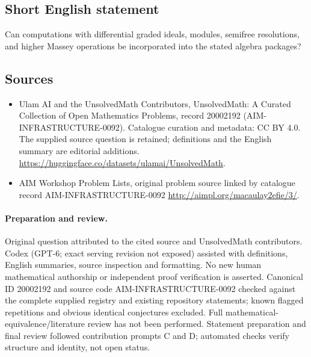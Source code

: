 \documentclass[11pt]{article}
\begin{document}
\subsection{Short English statement}
Can computations with differential graded ideals, modules, semifree resolutions, and higher Massey operations be incorporated into the stated algebra packages?
\subsection{Sources}
\begin{itemize}
\item[\hypertarget{source:20002192:1}{S1}] Ulam AI and the UnsolvedMath Contributors, UnsolvedMath: A Curated Collection of Open Mathematics Problems, record 20002192 (AIM-INFRASTRUCTURE-0092). Catalogue curation and metadata: CC BY 4.0. The supplied source question is retained; definitions and the English summary are editorial additions.
\url{https://huggingface.co/datasets/ulamai/UnsolvedMath}.
\item[\hypertarget{source:20002192:2}{S2}] AIM Workshop Problem Lists, original problem source linked by catalogue record AIM-INFRASTRUCTURE-0092
\url{http://aimpl.org/macaulay2efie/3/}.
\end{itemize}
\paragraph{Preparation and review.}
Original question attributed to the cited source and UnsolvedMath contributors. Codex (GPT-6; exact serving revision not exposed) assisted with definitions, English summaries, source inspection and formatting. No new human mathematical authorship or independent proof verification is asserted. Canonical ID 20002192 and source code AIM-INFRASTRUCTURE-0092 checked against the complete supplied registry and existing repository statements; known flagged repetitions and obvious identical conjectures excluded. Full mathematical-equivalence/literature review has not been performed. Statement preparation and final review followed contribution prompts C and D; automated checks verify structure and identity, not open status.
\label{end:20002192}
\end{document}
